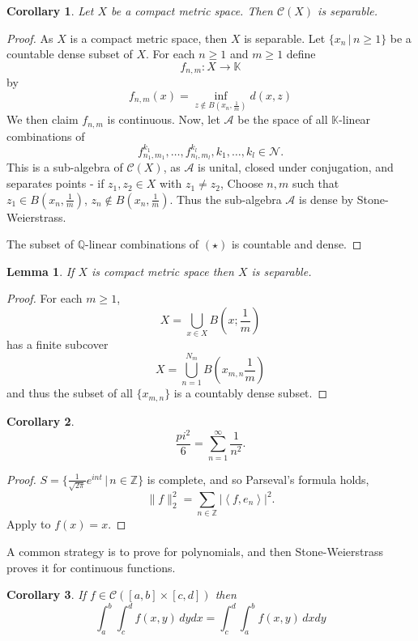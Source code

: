 \documentclass[justified]{tufte-book}
\theoremstyle{plain}%
\newtheorem{lem}[thm]{Lemma}
\newtheorem*{cor}{Corollary}
\theoremstyle{definition}
\theoremstyle{remark}
\newcommand{\given}{ \, | \,}
\newcommand{\Q}{\mathbb{Q}}
\newcommand{\K}{\mathbb{K}}
\newcommand{\Z}{\mathbb{Z}}
\newcommand{\iprod}[1]{\left\langle #1 \right\rangle}
\begin{document}
\begin{cor}
  Let $X$ be a compact metric space.  Then $\mathcal C(X)$ is separable.
\end{cor}
\begin{proof}
  As $X$ is a compact metric space, then $X$ is separable.  
  Let $\{ x_n \given n \geq 1 \}$ be a countable dense subset of $X$.  For each $n \geq 1$ and $m \geq 1$ define \[
      f_{n,m} : X \rightarrow \K
  \] by \[f_{n,m}(x) = \inf_{z \notin B(x_n, \frac{1}{m})} d(x,z)\]
  We then claim $f_{n,m}$ is continuous.  Now, let $\mathcal{A}$ be the space of all $\K$-linear combinations of \begin{equation*}
      f^{k_1}_{n_1,m_1}, \dots, f_{n_l, m_l}^{k_l}, k_1, \dots, k_l \in \mathcal{N}. \tag{$\star$}
  \end{equation*}
 This is a sub-algebra of $\mathcal C(X)$, as $\mathcal A$ is unital, closed under conjugation, and separates points - if $z_1, z_2 \in X$ with $z_1 \neq z_2$, Choose $n,m$ such that $z_1 \in B(x_n, \frac{1}{m})$, $z_n \notin B(x_n, \frac{1}{m})$.  Thus the sub-algebra $\mathcal A$ is dense by Stone-Weierstrass.  
  
  The subset of $\Q$-linear combinations of $(\star)$ is countable and dense.
\end{proof}

\begin{lem}
  If $X$ is compact metric space then $X$ is separable.  
\end{lem}
\begin{proof}
  For each $m \geq 1$, \[
      X = \bigcup_{x \in X} B(x ; \frac{1}{m})
  \]  has a finite subcover \[
      X = \bigcup_{n=1}^{N_m} B(x_{m,n} \frac{1}{m})
  \] and thus the subset of all $\{x_{m,n} \}$ is a countably dense subset. 
\end{proof}

\begin{cor}
  \[
  \frac{pi^2}{6} = \sum_{n = 1}^\infty \frac{1}{n^2}.
  \] 
\end{cor}

\begin{proof}
  $S = \{ \frac{1}{\sqrt{2 \pi}} e^{i nt } \given n \in \Z \}$ is complete, and so Parseval's formula holds, \[
      \| f \|_2^2 = \sum_{ n \in \Z} | \iprod{f, e_n} |^2.
  \]  Apply to $f(x) = x$.  
\end{proof}

A common strategy is to prove for polynomials, and then Stone-Weierstrass proves it for continuous functions.  
\begin{cor}
  If $ f \in \mathcal C([a,b] \times [c,d])$ then \[
      \int_a^b \int_c^d f(x,y) \, dy dx = \int_c^d \int_a^b f(x,y) \, dx dy
  \]
\end{cor}
\end{document}
